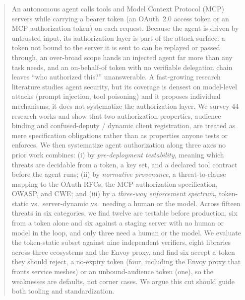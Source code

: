 \begin{abstract}
An autonomous agent calls tools and Model Context Protocol (MCP) servers while
carrying a bearer token (an OAuth~2.0 access token or an MCP authorization token)
on each request. Because the agent is driven by untrusted input, its authorization
layer is part of the attack surface: a token not bound to the server it is sent to
can be replayed or passed through, an over-broad scope hands an injected agent far
more than any task needs, and an on-behalf-of token with no verifiable delegation
chain leaves ``who authorized this?'' unanswerable. A fast-growing research
literature studies agent security, but its coverage is densest on model-level attacks
(prompt injection, tool poisoning) and it proposes individual mechanisms; it does not
systematize the authorization layer. We survey 44 research works and show that two
authorization properties, audience binding and confused-deputy / dynamic client
registration, are treated as mere specification obligations rather than as
properties anyone tests or enforces. We then systematize agent authorization along
three axes no prior work combines: (i) by \emph{pre-deployment testability}, meaning
which threats are decidable from a token, a key set, and a declared tool contract
before the agent runs; (ii) by \emph{normative provenance}, a threat-to-clause mapping to
the OAuth RFCs, the MCP authorization specification, OWASP, and CWE; and (iii) by a
\emph{three-way enforcement spectrum}, token-static vs.\ server-dynamic vs.\ needing a
human or the model. Across fifteen threats in six categories, we find twelve are
testable before production, six from a token alone and six against a staging server
with no human or model in the loop, and only three need a human or the model. We
evaluate the token-static subset against nine independent verifiers, eight libraries
across three ecosystems and the Envoy proxy, and find six accept a token they should
reject, a no-expiry token (four, including the Envoy proxy that fronts service meshes)
or an unbound-audience token (one), so the weaknesses are defaults, not corner cases. We argue this cut should guide both tooling and standardization.
\end{abstract}
